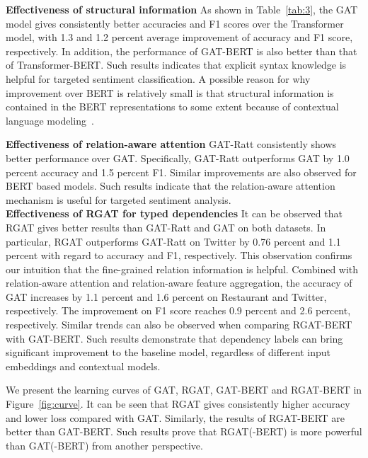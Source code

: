 \documentclass[journal]{IEEEtran}
\begin{document}
	\noindent\textbf{Effectiveness of structural information} As shown in Table~\ref{tab:3}, the GAT model gives consistently better accuracies and F1 scores over the Transformer model, with 1.3 and 1.2 percent average improvement of accuracy and F1 score, respectively.
	In addition, the performance of GAT-BERT is also better than that of Transformer-BERT. 
	Such results indicates that explicit syntax knowledge is helpful for targeted sentiment classification.
	A possible reason for why improvement over BERT is relatively small is that structural information is contained in the BERT representations to some extent because of contextual language modeling~\cite{jawahar-etal-2019-bert}.
	
	\noindent\textbf{Effectiveness of relation-aware attention}
GAT-Ratt consistently shows better performance over GAT.
	Specifically, GAT-Ratt outperforms GAT by 1.0 percent accuracy and 1.5 percent F1. 
	Similar improvements are also observed for BERT based models.
	Such results indicate that the relation-aware attention mechanism is useful for targeted sentiment analysis.\\
	\noindent\textbf{Effectiveness of RGAT for typed dependencies} It can be observed that RGAT gives better results than GAT-Ratt and GAT on both datasets. 
	In particular, RGAT outperforms GAT-Ratt on Twitter by 0.76 percent and 1.1 percent with regard to accuracy and F1, respectively.
	This observation confirms our intuition that the fine-grained relation information is helpful.
	Combined with relation-aware attention and relation-aware feature aggregation, the accuracy of GAT increases by 1.1 percent and 1.6 percent on Restaurant and Twitter, respectively.
	The improvement on F1 score reaches 0.9 percent and 2.6 percent, respectively.
	Similar trends can also be observed when comparing RGAT-BERT with GAT-BERT.
	Such results demonstrate that dependency labels can bring significant improvement to the baseline model, regardless of different input embeddings and contextual models.
	
	{We present the learning curves of GAT, RGAT, GAT-BERT and RGAT-BERT in Figure~\ref{fig:curve}. 
	It can be seen that RGAT gives consistently higher accuracy and lower loss compared with GAT. 
	Similarly, the results of RGAT-BERT are better than GAT-BERT.
	Such results prove that RGAT(-BERT) is more powerful than GAT(-BERT) from another perspective.
    }
\end{document}
